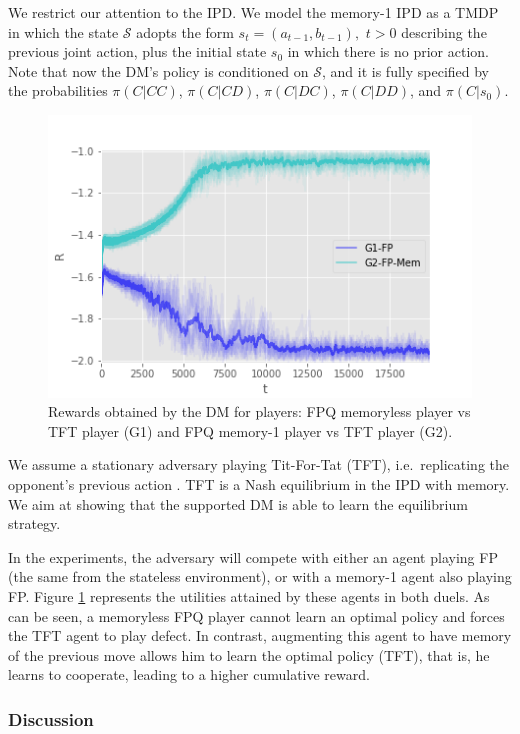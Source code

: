 We restrict our attention to the IPD. We model the memory-1 IPD as a TMDP in which the state $\mathcal{S}$ adopts the form $s_t = (a_{t-1}, b_{t-1}), \,\,  t > 0$
describing the previous joint action, plus the initial state $s_0$ in which there
is no prior action. Note that now the DM's policy is conditioned on
$\mathcal{S}$, and it is fully specified by the probabilities
$\pi(C | CC)$, $\pi(C | CD)$, $\pi(C | DC)$, $\pi(C | DD)$, and  $\pi(C | s_0)$.

\begin{figure}[h!]
\centering
\includegraphics[scale=0.5]{figures/MemvsTFT_G1}%
\caption{Rewards obtained by the DM for players: FPQ memoryless player vs TFT player (G1) and FPQ memory-1 player vs TFT player (G2).}\label{fig:Mem1}
\end{figure}

\noindent We assume a stationary adversary playing Tit-For-Tat (TFT), i.e.\ replicating
the opponent's previous action \parencite{axelrod84}. TFT is a Nash equilibrium in the IPD with memory.
We aim at showing that the supported DM is able to learn the equilibrium strategy. 

In the experiments, the adversary will compete with either an agent playing FP (the same from the stateless environment), or with a memory-1 agent also playing FP. Figure \ref{fig:Mem1} represents the utilities attained by these agents in both duels. As can be seen, a memoryless FPQ player cannot learn an optimal policy and forces the TFT agent to play defect. In contrast, augmenting this agent to have memory of the previous move allows him to learn the optimal policy (TFT), that is, he learns to cooperate, leading to a higher cumulative reward.

\subsubsection{Discussion}

